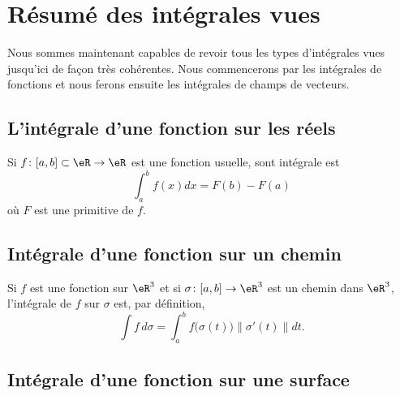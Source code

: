 \section{Résumé des intégrales vues}

Nous sommes maintenant capables de revoir tous les types d'intégrales vues jusqu'ici de façon très cohérentes. Nous commencerons par les intégrales de fonctions et nous ferons ensuite les intégrales de champs de vecteurs.

\subsection{L'intégrale d'une fonction sur les réels}

Si $f\colon \mathopen[ a , b \mathclose]\subset\eR\to \eR$ est une fonction usuelle, sont intégrale est
\begin{equation}
    \int_a^bf(x)dx=F(b)-F(a)
\end{equation}
où $F$ est une primitive de $f$.

\subsection{Intégrale d'une fonction sur un chemin}

Si $f$ est une fonction sur $\eR^3$ et si $\sigma\colon \mathopen[ a , b \mathclose]\to \eR^3$ est un chemin dans $\eR^3$, l'intégrale de $f$ sur $\sigma$ est, par définition, 
\begin{equation}
    \int f\,d\sigma=\int_a^b f\big( \sigma(t) \big)\| \sigma'(t) \|dt.
\end{equation}

\subsection{Intégrale d'une fonction sur une surface}


